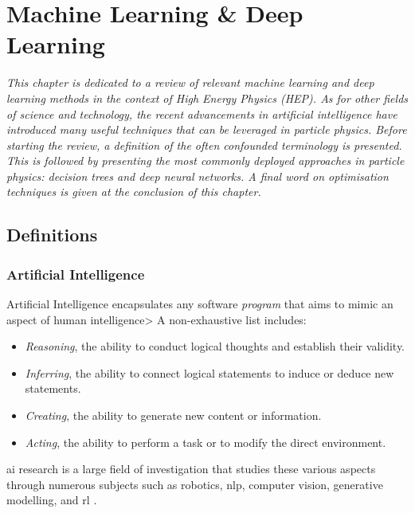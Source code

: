 \chapter{\color{oxfordblue} Machine Learning \& Deep Learning}\label{Chap-ML}
\ChapFrame

\textit{
This chapter is dedicated to a review of relevant machine learning and deep learning methods in the context of High Energy Physics (HEP). As for other fields of science and technology, the recent advancements in artificial intelligence have introduced many useful techniques that can be leveraged in particle physics. Before starting the review, a definition of the often confounded terminology is presented. This is followed by presenting the most commonly deployed approaches in particle physics: decision trees and deep neural networks. A final word on optimisation techniques is given at the conclusion of this chapter.
}

\section{Definitions}
\subsection{Artificial Intelligence}
Artificial Intelligence encapsulates any software \textit{program} that aims to mimic an aspect of human intelligence> A non-exhaustive list includes: 
\begin{itemize}
    \item \textit{Reasoning}, the ability to conduct logical thoughts and establish their validity.
    \item \textit{Inferring}, the ability to connect logical statements to induce or deduce new statements.
    \item \textit{Creating}, the ability to generate new content or information. 
    \item \textit{Acting}, the ability to perform a task or to modify the direct environment.
\end{itemize}
\gls{ai} research is a large field of investigation that studies these various aspects through numerous subjects such as robotics, \gls{nlp}, computer vision, generative modelling, and \gls{rl} \cite{russel2010}. \\

